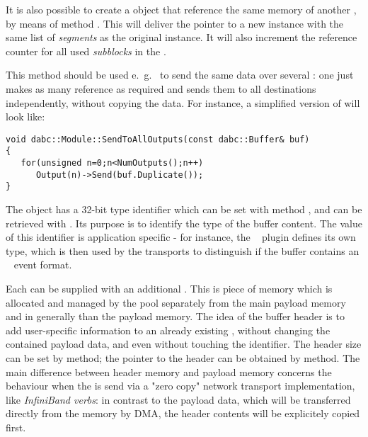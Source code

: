 It is also possible to create a  object that reference 
the same memory of another , by means of method
.
This will deliver the pointer to a new
 instance with the same list of {\em segments}
as the original instance. It will also
increment the reference counter for all used  
{\em subblocks} in the . 

This method should be used e.~g.~ to send
the same data over several : 
one just makes as many reference   
as required and sends them to all destinations independently,
without copying the data.
For instance, a simplified version of 
 will look like:  

\begin{small}
\begin{verbatim}     
void dabc::Module::SendToAllOutputs(const dabc::Buffer& buf)
{
   for(unsigned n=0;n<NumOutputs();n++)
      Output(n)->Send(buf.Duplicate());
}
\end{verbatim}     
\end{small}


The  object has a 32-bit type identifier which can be set with
method , and can be retrieved with .
Its purpose is to identify the type of the buffer content. The value of   
this identifier is application specific - for instance, 
the \mbs~ plugin defines its own type,
which is then used by the transports to distinguish if the buffer 
contains an \mbs~ event format.  

Each  can be supplied with an additional . 
This is piece of 
memory which is allocated and managed by the pool separately from the main  
payload memory and in generally  than the payload memory. 
The idea of the buffer header is to add user-specific
information to an already existing ,
without changing the contained payload data, and
even without touching the  identifier. 
The header size can be set by  method;
the pointer to the header can be
obtained by  method.
The main difference between header memory and payload memory 
concerns the behaviour when the  is send via 
a "zero copy" network transport implementation, like {\em InfiniBand verbs}:
in contrast to the payload data, which will be
transferred directly from the  memory by DMA, 
the header contents will be explicitely copied first.


